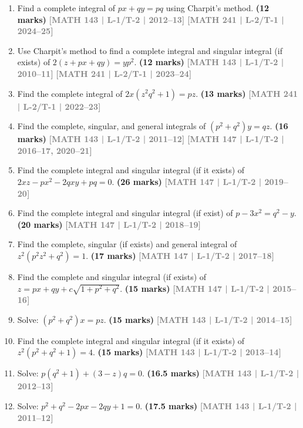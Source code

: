 \documentclass[12pt]{article}
\newcommand{\yr}[1]{\hfill\textcolor{gray}{\small\textbf{[#1]}}}
\newcommand{\mk}[1]{\textcolor{orange!70!black}{\small\textbf{(#1 marks)}}}
\begin{document}
\begin{enumerate}

\item Find a complete integral of $px+qy=pq$ using Charpit's method.
\mk{12} \yr{MATH 143 | L-1/T-2 | 2012--13} \yr{MATH 241 | L-2/T-1 | 2024--25}

\item Use Charpit's method to find a complete integral and singular integral (if exists) of $2(z+px+qy)=yp^{2}$.
\mk{12} \yr{MATH 143 | L-1/T-2 | 2010--11} \yr{MATH 241 | L-2/T-1 | 2023--24}

\item Find the complete integral of $2x(z^{2}q^{2}+1)=pz$.
\mk{13} \yr{MATH 241 | L-2/T-1 | 2022--23}

\item Find the complete, singular, and general integrals of $(p^{2}+q^{2})y=qz$.
\mk{16} \yr{MATH 143 | L-1/T-2 | 2011--12} \yr{MATH 147 | L-1/T-2 | 2016--17, 2020--21}

\item Find the complete integral and singular integral (if it exists) of $2xz-px^{2}-2qxy+pq=0$.
\mk{26} \yr{MATH 147 | L-1/T-2 | 2019--20}

\item Find the complete integral and singular integral (if exist) of $p-3x^{2}=q^{2}-y$.
\mk{20} \yr{MATH 147 | L-1/T-2 | 2018--19}

\item Find the complete, singular (if exists) and general integral of $z^{2}(p^{2}z^{2}+q^{2})=1$.
\mk{17} \yr{MATH 147 | L-1/T-2 | 2017--18}

\item Find the complete and singular integral (if exists) of $z=px+qy+c\sqrt{1+p^{2}+q^{2}}$.
\mk{15} \yr{MATH 147 | L-1/T-2 | 2015--16}

\item Solve: $(p^{2}+q^{2})x=pz$.
\mk{15} \yr{MATH 143 | L-1/T-2 | 2014--15}

\item Find the complete integral and singular integral (if it exists) of $z^{2}(p^{2}+q^{2}+1)=4$.
\mk{15} \yr{MATH 143 | L-1/T-2 | 2013--14}

\item Solve: $p(q^{2}+1)+(3-z)q=0$.
\mk{16.5} \yr{MATH 143 | L-1/T-2 | 2012--13}

\item Solve: $p^{2}+q^{2}-2px-2qy+1=0$.
\mk{17.5} \yr{MATH 143 | L-1/T-2 | 2011--12}

\end{enumerate}
\end{document}
